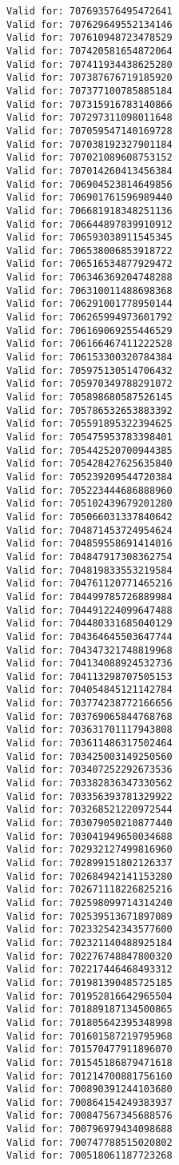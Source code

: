 \documentclass[11pt]{article}
\begin{document}
\begin{Verbatim}[commandchars=\\\{\}]
Valid for: 707693576495472641
Valid for: 707629649552134146
Valid for: 707610948723478529
Valid for: 707420581654872064
Valid for: 707411934438625280
Valid for: 707387676719185920
Valid for: 707377100785885184
Valid for: 707315916783140866
Valid for: 707297311098011648
Valid for: 707059547140169728
Valid for: 707038192327901184
Valid for: 707021089608753152
Valid for: 707014260413456384
Valid for: 706904523814649856
Valid for: 706901761596989440
Valid for: 706681918348251136
Valid for: 706644897839910912
Valid for: 706593038911545345
Valid for: 706538006853918722
Valid for: 706516534877929472
Valid for: 706346369204748288
Valid for: 706310011488698368
Valid for: 706291001778950144
Valid for: 706265994973601792
Valid for: 706169069255446529
Valid for: 706166467411222528
Valid for: 706153300320784384
Valid for: 705975130514706432
Valid for: 705970349788291072
Valid for: 705898680587526145
Valid for: 705786532653883392
Valid for: 705591895322394625
Valid for: 705475953783398401
Valid for: 705442520700944385
Valid for: 705428427625635840
Valid for: 705239209544720384
Valid for: 705223444686888960
Valid for: 705102439679201280
Valid for: 705066031337840642
Valid for: 704871453724954624
Valid for: 704859558691414016
Valid for: 704847917308362754
Valid for: 704819833553219584
Valid for: 704761120771465216
Valid for: 704499785726889984
Valid for: 704491224099647488
Valid for: 704480331685040129
Valid for: 704364645503647744
Valid for: 704347321748819968
Valid for: 704134088924532736
Valid for: 704113298707505153
Valid for: 704054845121142784
Valid for: 703774238772166656
Valid for: 703769065844768768
Valid for: 703631701117943808
Valid for: 703611486317502464
Valid for: 703425003149250560
Valid for: 703407252292673536
Valid for: 703382836347330562
Valid for: 703356393781329922
Valid for: 703268521220972544
Valid for: 703079050210877440
Valid for: 703041949650034688
Valid for: 702932127499816960
Valid for: 702899151802126337
Valid for: 702684942141153280
Valid for: 702671118226825216
Valid for: 702598099714314240
Valid for: 702539513671897089
Valid for: 702332542343577600
Valid for: 702321140488925184
Valid for: 702276748847800320
Valid for: 702217446468493312
Valid for: 701981390485725185
Valid for: 701952816642965504
Valid for: 701889187134500865
Valid for: 701805642395348998
Valid for: 701601587219795968
Valid for: 701570477911896070
Valid for: 701545186879471618
Valid for: 701214700881756160
Valid for: 700890391244103680
Valid for: 700864154249383937
Valid for: 700847567345688576
Valid for: 700796979434098688
Valid for: 700747788515020802
Valid for: 700518061187723268

\end{Verbatim}
\end{document}
